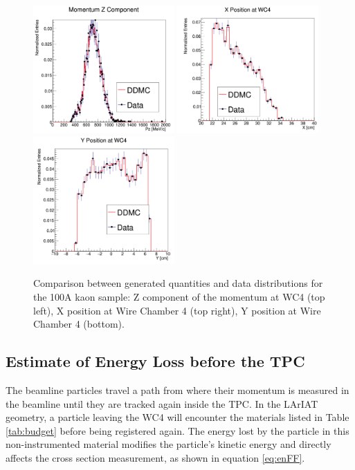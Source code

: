 \begin{figure}[hpbt]
\centering
\includegraphics[width=0.48\textwidth]{Chapter-5/Images/DDMCPz.png}
\includegraphics[width=0.48\textwidth]{Chapter-5/Images/DDMCX.png}
\includegraphics[width=0.48\textwidth]{Chapter-5/Images/DDMCY.png}
\caption{Comparison between generated quantities and data distributions for the 100A kaon sample: Z component of the momentum at WC4 (top left), X position at Wire Chamber 4 (top right), Y position at Wire Chamber 4 (bottom).}
\label{fig:DDMCComparison}
\end{figure}



\subsection{Estimate of Energy Loss before the TPC}\label{ch:eloss}
The beamline particles travel a path from where their  momentum is measured in the beamline until they are tracked again inside the TPC. In the LArIAT geometry, a particle leaving the WC4 will encounter the materials listed in Table \ref{tab:budget} before being registered again. The energy lost by the particle in this non-instrumented material modifies the particle's kinetic energy and directly affects the cross section measurement, as shown in equation \ref{eq:enFF}.

